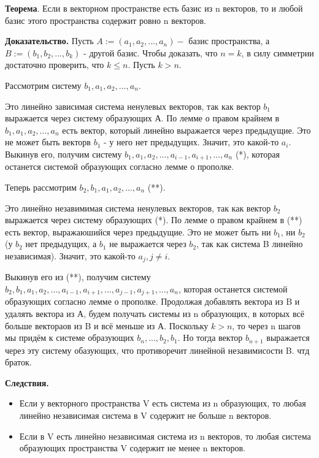 \documentclass[a4paper]{article}
\begin{document}
{\begin{small}
\textbf{Теорема}. Если в векторном пространстве есть базис из n векторов, то и любой базис этого пространства содержит ровно n векторов.

\textbf{Доказательство.} Пусть $A := (a_1, a_2, ..., a_n) - $ базис пространства, а $B := (b_1, b_2, ..., b_k)$ - другой базис. Чтобы доказать, что $n=k$, в силу симметрии достаточно проверить, что $k \leq n$. Пусть $k > n$.

Рассмотрим систему $b_1, a_1, a_2, ..., a_n$.

Это линейно зависимая система ненулевых векторов, так как вектор $b_1$ выражается через систему образующих А. По лемме о правом крайнем в $b_1, a_1, a_2, ..., a_n$ есть вектор, который линейно выражается через предыдущие. Это не может быть векторв $b_1$ - у него нет предыдущих. Значит, это какой-то $a_i$. Выкинув его, получим систему $b_1, a_1, a_2, ..., a_{i-1}, a_{i+1}, ..., a_n $ (*), которая останется системой образующих согласно лемме о прополке.

Теперь рассмотрим $b_2, b_1, a_1, a_2, ..., a_n$ (**).

Это линейно незавимимая система ненулевых векторов, так как вектор $b_2$ выражается через систему образующих (*). По лемме о правом крайнем в (**) есть вектор, выражаюшийся через предыдущие. Это не может быть ни $b_1$, ни $b_2$ (у $b_2$ нет предыдущих, а $b_1$ не выражается через $b_2$, так как система B линейно независимая). Значит, это какой-то $a_j, j \neq i$.

Выкинув его из (**), получим систему $b_2, b_1, a_1, a_2, ..., a_{i-1}, a_{i+1}, ..., a_{j-1}, a_{j+1}, ...,a_n$, которая останется системой образующих согласно лемме о прополке. Продолжая добавлять вектора из B и удалять вектора из А, будем получать системы из n образующих, в которых всё больше вектораов из B и всё меньше из А. Поскольку $k>n$, то через n шагов мы придём к системе образующих $b_n, ..., b_2, b_1$. Но тогда вектор $b_{n+1}$ выражается через эту систему обазующих, что противоречит линейной незавимисости B. чтд браток.


\textbf{Следствия.}
\begin{itemize}
\item Если у векторного пространства V есть система из n образующих, то любая линейно независимая система в V содержит не больше n векторов.
\item  Если в V есть линейно независимая система из n векторов, то любая система образующих пространства V содержит не менее n векторов.
\end{itemize}






\end{small}}
\end{document}

